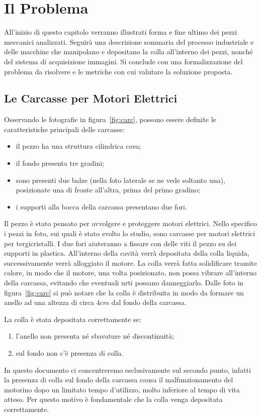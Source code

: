 
\chapter{Il Problema}
All'inizio di questo capitolo verranno illustrati forma e fine ultimo dei pezzi meccanici analizzati.
Seguirà una descrizione sommaria del processo industriale e delle macchine che manipolano e depositano la colla all'interno dei pezzi, nonché del sistema di acquisizione immagini.
Si conclude con una formalizzazione del problema da risolvere e le metriche con cui valutare la soluzione proposta.

\section{Le Carcasse per Motori Elettrici}

Osservando le fotografie in figura~\ref{fig:carc}, possono essere definite le caratteristiche principali delle carcasse:
\begin{itemize}
  \item il pezzo ha una struttura cilindrica cava;
  \item il fondo presenta tre gradini;
  \item sono presenti due balze (nella foto laterale se ne vede soltanto una), posizionate una di fronte all'altra, prima del primo gradino;
  \item i supporti alla bocca della carcassa presentano due fori.
\end{itemize}
Il pezzo è stato pensato per avvolgere e proteggere motori elettrici.
Nello specifico i pezzi in foto, sui quali è stato svolto lo studio, sono carcasse per motori elettrici per tergicristalli.
I due fori aiuteranno a fissare con delle viti il pezzo su dei supporti in plastica.
All'interno della cavità verrà depositata della colla liquida, successivamente verrà alloggiato il motore.
La colla verrà fatta solidificare tramite calore, in modo che il motore, una volta posizionato, non possa vibrare all'interno della carcassa, evitando che eventuali urti possano danneggiarlo.
Dalle foto in figura~\ref{fig:carc} si può notare che la colla è distribuita in modo da formare un anello ad una altezza di circa $4cm$ dal fondo della carcassa.

La colla è stata depositata correttamente se:
\begin{enumerate}
  \item l'anello non presenta né sbavature né discontinuità;
  \item sul fondo non c'è presenza di colla.
\end{enumerate}
In questo documento ci concentreremo esclusivamente sul secondo punto, infatti la presenza di colla sul fondo della carcassa causa il malfunzionamento del motorino dopo un limitato tempo d'utilizzo, molto inferiore al tempo di vita atteso.
Per questo motivo è fondamentale che la colla venga depositata correttamente.

